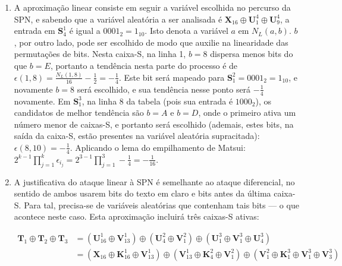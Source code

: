 \documentclass{../sftex/sftex}
\begin{document}
\begin{enumerate}
    \item A aproximação linear consiste em seguir a variável escolhida no
        percurso da SPN, e sabendo que a variável aleatória a ser analisada é
        $\textbf{X}_{16} \oplus \textbf{U}^{4}_{1} \oplus \textbf{U}^{4}_{9}$,
        a entrada em $\textbf{S}^{1}_{4}$ é igual a $0001_{2} = 1_{10}$. Isto
        denota a variável $a$ em $N_{L}(a, b)$. $b$, por outro lado, pode ser
        escolhido de modo que auxilie na linearidade das permutações de bits.
        Nesta caixa-S, na linha 1, $b = 8$ dispersa menos bits do que $b = E$,
        portanto a tendência nesta parte do processo é de
        $\epsilon(1, 8) = \frac{N_{L}(1, 8)}{16} - \frac{1}{2} = -\frac{1}{4}$.
        Este bit será mapeado para $\textbf{S}^{2}_{1} = 0001_{2} = 1_{10}$,
        e novamente $b = 8$ será escolhido, e sua tendência nesse ponto será
        $-\frac{1}{4}$ novamente. Em $\textbf{S}^{3}_{1}$, na linha 8 da
        tabela (pois sua entrada é $1000_{2}$), os candidatos de melhor
        tendência são $b = A$ e $b = D$, onde o primeiro ativa um número menor
        de caixas-S, e portanto será escolhido (ademais, estes bits, na saída
        da caixa-S, estão presentes na variável aleatória supracitada):
        $\epsilon(8, 10) = -\frac{1}{4}$. Aplicando o lema do empilhamento de
        Matsui: $2^{k-1} \prod_{j=1}^{k} \epsilon_{i_{j}}
        = 2^{3-1} \prod_{j=1}^{3} -\frac{1}{4} = -\frac{1}{16}$.

    \item A justificativa do ataque linear à SPN é semelhante ao ataque
        diferencial, no sentido de ambos usarem bits do texto em claro e bits
        antes da última caixa-S. Para tal, precisa-se de variáveis aleatórias
        que contenham tais bits --- o que acontece neste caso. Esta aproximação
        incluirá três caixas-S ativas: \vspace{-4mm}

    \begin{align*}
        \textbf{T}_{1} \oplus \textbf{T}_{2} \oplus \textbf{T}_{3}
        &=  (\textbf{U}^{1}_{16} \oplus \textbf{V}^{1}_{13}) \oplus
                (\textbf{U}^{2}_{4} \oplus \textbf{V}^{2}_{1}) \oplus
                (\textbf{U}^{3}_{1} \oplus \textbf{V}^{3}_{1} \oplus
                    \textbf{U}^{3}_{4}) \\
        &=  (\textbf{X}_{16} \oplus \textbf{K}^{1}_{16} \oplus
                \textbf{V}^{1}_{13}) \oplus
            (\textbf{V}^{1}_{13} \oplus \textbf{K}^{2}_{4} \oplus
                \textbf{V}^{2}_{1}) \oplus
            (\textbf{V}^{2}_{1} \oplus \textbf{K}^{3}_{1} \oplus
                \textbf{V}^{3}_{1} \oplus \textbf{V}^{3}_{3})
        \end{align*}


\end{enumerate}
\end{document}
